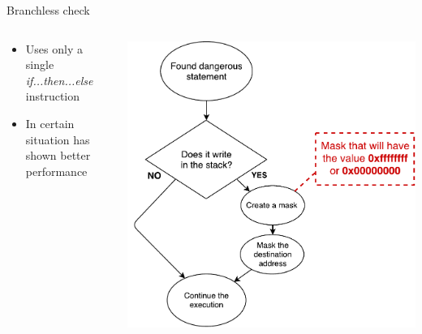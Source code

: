 \documentclass{beamer}
\begin{document}
\begin{frame}[c]{Branchless check}
	\begin{columns}
		\begin{column}{0.35\textwidth}
			\begin{itemize}
				\item Uses only a single \textit{if...then...else} instruction
				\item In certain situation has shown better performance
			\end{itemize}
		\end{column}
		\begin{column}{0.65\textwidth}
			\includegraphics[height=0.8\textheight]{images/branchless_check.pdf}
		\end{column}
	\end{columns}
\end{frame}
%
\end{document}
